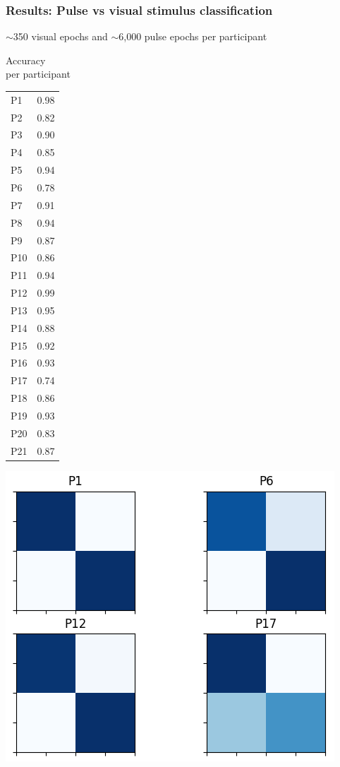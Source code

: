 \documentclass{beamer}
\begin{document}
\begin{frame}
	\frametitle{Results: Pulse vs visual stimulus classification}

	$\mathtt{\sim}$350 visual epochs and $\mathtt{\sim}$6,000 pulse epochs per participant

	\begin{minipage}{0.3\linewidth}
	Accuracy \\
	per participant
	\begin{table}
	\tiny
	\begin{tabular}{l|l}
		P1 & 0.98 \\
		P2 & 0.82 \\
		P3 & 0.90 \\
		P4 & 0.85 \\
		P5 & 0.94 \\
		P6 & 0.78 \\
		P7 & 0.91 \\
		P8 & 0.94 \\
		P9 & 0.87 \\
		P10 & 0.86 \\
		P11 & 0.94 \\
		P12 & 0.99 \\
		P13 & 0.95 \\
		P14 & 0.88 \\
		P15 & 0.92 \\
		P16 & 0.93 \\
		P17 & 0.74 \\
		P18 & 0.86 \\
		P19 & 0.93 \\
		P20 & 0.83 \\
		P21 & 0.87 \\
	\end{tabular}
	\end{table}
	\end{minipage}
	\begin{minipage}{0.6\linewidth}
		\centering
		\includegraphics[scale=0.6]{fig15.png}
	\end{minipage}

\end{frame}
\end{document}
